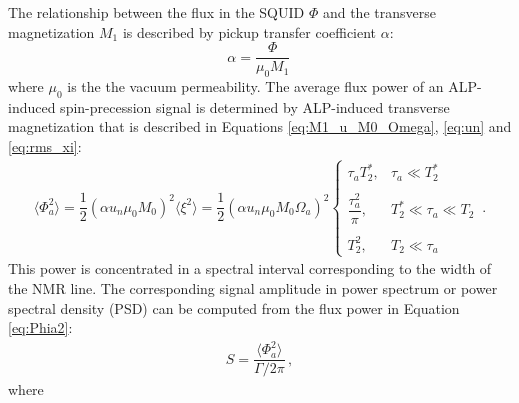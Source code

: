 The relationship between the flux in the SQUID $\Phi$ and the transverse magnetization $M_1$ is described by pickup transfer coefficient $\alpha$:
\begin{equation}
    \alpha = \dfrac{\Phi}{\mu_0 M_1}
    \,\label{eq:alpha}
\end{equation}
where $\mu_0$ is the the vacuum permeability. 
The average flux power of an ALP-induced spin-precession signal is determined by ALP-induced transverse magnetization that is described in Equations \eqref{eq:M1_u_M0_Omega}, \eqref{eq:un} and \eqref{eq:rms_xi}:
\begin{align}
    \langle \Phi_a^2 \rangle = \dfrac{1}{2}(\alpha u_n \mu_0 M_0 )^2 \langle \xi^2 \rangle
    =\dfrac{1}{2}(\alpha u_n \mu_0 M_0 \Omega_a)^2 \left\{
    \begin{array}{cl}
    \tau_a T_2^* ,
    &  \tau_a \ll T_2^*\\
    & \\
    \dfrac{\tau_a^2}{\pi} ,
    &  T_2^*\ll\tau_a \ll T_2\\
    & \\
    T_2^2 ,
    &  T_2 \ll \tau_a
    \end{array} \right.
    \,. \label{eq:Phia2}
\end{align}
This power is concentrated in a spectral interval corresponding to the width of the NMR line.
The corresponding signal amplitude in power spectrum or power spectral density (PSD) can be computed from the flux power in Equation\,\eqref{eq:Phia2}:
\begin{align}
    S = \dfrac{\langle \Phi_a^2 \rangle}{\Gamma /2\pi} 
    \,, \label{eq:S_expectation}
\end{align}
where 
